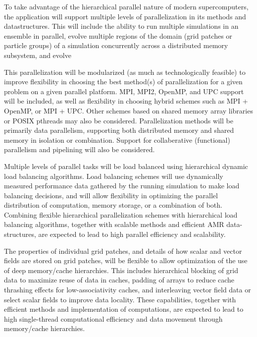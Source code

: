\documentclass{book}
\begin{document}

     To take advantage of the
   hierarchical parallel nature of modern supercomputers, the
   application will support multiple levels of parallelization in its
   methods and datastructures.  This will include the ability to run
   multiple simulations in an ensemble in parallel, evolve multiple
   regions of the domain (grid patches or particle groups) of a simulation
   concurrently across a distributed memory subsystem, and evolve
   

   This parallelization will be modularized (as much as technologically
   feasible) to improve flexibility in choosing the best method(s) of
   parallelization for a given problem on a given parallel platform.
   MPI, MPI2, OpenMP, and UPC support will be included, as well as
   flexibility in choosing hybrid schemes such as MPI + OpenMP, or MPI
   + UPC.  Other schemes based on shared memory array libraries or
   POSIX pthreads may also be considered.  Parallelization methods
   will be primarily data parallelism, supporting both distributed
   memory and shared memory in isolation or combination.  Support for
   collaberative (functional) parallelism and pipelining will also be
   considered.


     Multiple levels of parallel tasks
   will be load balanced using hierarchical dynamic load balancing
   algorithms.  Load balancing schemes will use dynamically measured
   performance data gathered by the running simulation to make load
   balancing decisions, and will allow flexibility in optimizing the
   parallel distribution of computation, memory storage, or a
   combination of both.  Combining flexible hierarchical
   parallelization schemes with hierarchical load balancing
   algorithms, together with scalable methods and efficient AMR
   data-structures, are expected to lead to high parallel efficiency
   and scalability.


   The properties of individual grid patches, and details of how
   scalar and vector fields are stored on grid patches, will be
   flexible to allow optimization of the use of deep memory/cache
   hierarchies.  This includes hierarchical blocking of grid data to 
   maximize reuse of data in caches, padding of arrays to reduce
   cache thrashing effects for low-associativity caches, and interleaving
   vector field data or select scalar fields to improve data locality.
   These capabilities, together with efficient methods and 
   implementation of computations, are expected to lead to high
   single-thread computational efficiency and data movement through
   memory/cache hierarchies.
\end{document}

